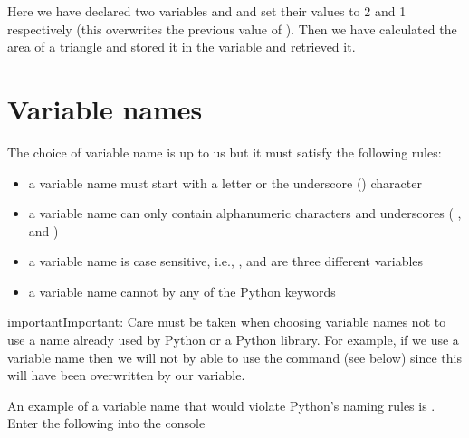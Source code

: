 \documentclass[letterpaper,10pt,english]{jupyterBook}
\begin{document}
\sphinxAtStartPar
Here we have declared two variables  and  and set their values to 2 and 1 respectively (this overwrites the previous value of ). Then we have calculated the area of a triangle and stored it in the variable  and retrieved it.


\part{Variable names}
\label{\detokenize{_pages/1.2_Python_variables:variable-names}}
\sphinxAtStartPar
The choice of variable name is up to us but it must satisfy the following rules:
\begin{itemize}
\item {} 
\sphinxAtStartPar
a variable name must start with a letter or the underscore (\sphinxcode{\sphinxupquote{\_}}) character

\item {} 
\sphinxAtStartPar
a variable name can only contain alpha\sphinxhyphen{}numeric characters and underscores ( \sphinxhyphen{} ,  \sphinxhyphen{}  and \sphinxcode{\sphinxupquote{\_}})

\item {} 
\sphinxAtStartPar
a variable name is case sensitive, i.e., ,  and  are three different variables

\item {} 
\sphinxAtStartPar
a variable name cannot by any of the Python keywords

\end{itemize}

\begin{sphinxadmonition}{important}{Important:}
\sphinxAtStartPar
Care must be taken when choosing variable names not to use a name already used by Python or a Python library. For example, if we use a variable name  then we will not by able to use the  command (see below) since this will have been overwritten by our variable.
\end{sphinxadmonition}

\sphinxAtStartPar
An example of a variable name that would violate Python’s naming rules is . Enter the following into the console
\end{document}
